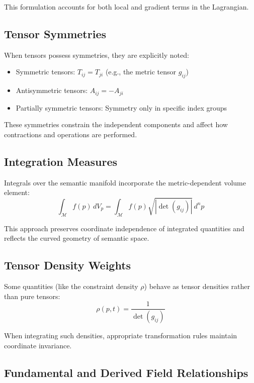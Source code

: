 This formulation accounts for both local and gradient terms in the Lagrangian.

\subsection{Tensor Symmetries}

When tensors possess symmetries, they are explicitly noted:
\begin{itemize}
    \item Symmetric tensors: \(T_{ij} = T_{ji}\) (e.g., the metric tensor \(g_{ij}\))
    \item Antisymmetric tensors: \(A_{ij} = -A_{ji}\)
    \item Partially symmetric tensors: Symmetry only in specific index groups
\end{itemize}

These symmetries constrain the independent components and affect how contractions and operations are performed.

\subsection{Integration Measures}

Integrals over the semantic manifold incorporate the metric-dependent volume element:
\begin{equation}
\int_{\mathcal{M}} f(p) \, dV_p = \int_{\mathcal{M}} f(p) \sqrt{|\det(g_{ij})|} \, d^n p
\end{equation}

This approach preserves coordinate independence of integrated quantities and reflects the curved geometry of semantic space.

\subsection{Tensor Density Weights}

Some quantities (like the constraint density \(\rho\)) behave as tensor densities rather than pure tensors:
\begin{equation}
\rho(p,t) = \frac{1}{\det(g_{ij})}
\end{equation}

When integrating such densities, appropriate transformation rules maintain coordinate invariance.

\subsection{Fundamental and Derived Field Relationships}

